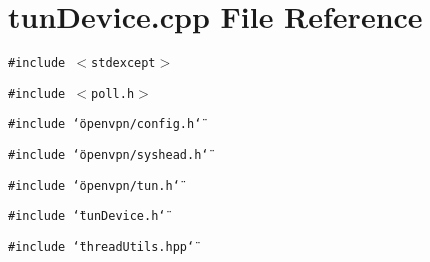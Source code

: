 \section{tun\-Device.cpp File Reference}
\label{tunDevice_8cpp}
{\tt \#include $<$stdexcept$>$}\par
{\tt \#include $<$poll.h$>$}\par
{\tt \#include \char`\"{}openvpn/config.h\char`\"{}}\par
{\tt \#include \char`\"{}openvpn/syshead.h\char`\"{}}\par
{\tt \#include \char`\"{}openvpn/tun.h\char`\"{}}\par
{\tt \#include \char`\"{}tun\-Device.h\char`\"{}}\par
{\tt \#include \char`\"{}thread\-Utils.hpp\char`\"{}}\par
